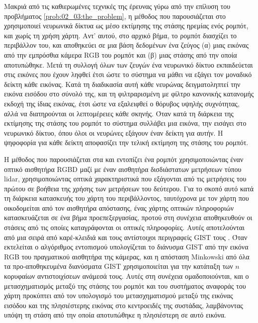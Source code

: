 Μακριά από τις καθιερωμένες τεχνικές της έρευνας γύρω από την επίλυση του
προβλήματος \ref{prob:02_03:the_problem}, η μέθοδος που παρουσιάζεται στο
\cite{Lyrio2014} χρησιμοποιεί νευρωνικά δίκτυα ως μέσο εκτίμησης της στάσης
ηρεμίας ενός ρομπότ, και χωρίς τη χρήση χάρτη. Αντ' αυτού, στο αρχικό βήμα, το
ρομπότ διασχίζει το περιβάλλον του, και αποθηκεύει σε μια βάση δεδομένων ένα
ζεύγος (α) μιας εικόνας από την εμπρόσθια κάμερα RGB του ρομπότ και (β) μιας
στάσης από την οποία αποτυπώθηκε.  Μετά τη συλλογή όλων των ζευγών ένα
νευρωνικό δίκτυο εκπαιδεύεται στις εικόνες που έχουν ληφθεί έτσι ώστε το
σύστημα να μάθει να εξάγει τον μοναδικό δείκτη κάθε εικόνας. Κατά τη διαδικασία
αυτή κάθε νευρώνας δειγματοληπτεί την εικόνα εισόδου στο σύνολό της, και τη
φιλτραρισμένη με φίλτρο κανονικής κατανομής εκδοχή της ίδιας εικόνας, έτσι ώστε
να εξαλειφθεί ο θόρυβος υψηλής συχνότητας, αλλά να διατηρούνται οι λεπτομέρειες
κάθε σκηνής.  Όταν κατά τη διάρκεια της εκτίμησης της στάσης του ρομπότ το
σύστημα συλλάβει μια εικόνα, την εισάγει στο νευρωνικό δίκτυο, όπου όλοι οι
νευρώνες εξάγουν έναν δείκτη για αυτήν. Η ψηφοφορία για κάθε δείκτη αποφασίζει
την τελική εκτίμηση της στάσης του ρομπότ.

Η μέθοδος που παρουσιάζεται στα \cite{Su2017} και \cite{Chen2019b} εντοπίζει
ένα ρομπότ χρησιμοποιώντας έναν οπτικό αισθητήρα RGBD μαζί με έναν αισθητήρα
δισδιάστατων μετρήσεων τύπου lidar, χρησιμοποιώντας οπτικά χαρακτηριστικά που
εξάγονται από τις μετρήσεις του πρώτου σε βοήθεια της χρήσης των μετρήσεων του
δεύτερου. Για το σκοπό αυτό κατά τη διάρκεια κατασκευής του χάρτη του
περιβάλλοντος, ταυτόχρονα με τον χάρτη που οικοδομείται από τον αισθητήρα
απόστασης, ένας χάρτης οπτικών πληροφοριών κατασκευάζεται σε ένα βήμα
προεπεξεργασίας, προτού στη συνέχεια αποθηκευθούν οι στάσεις από τις οποίες
καταγράφονται οι οπτικές πληροφορίες. Αυτές αποτελούνται από μια σειρά από
καρέ-κλειδιά και τους αντίστοιχοι περιγραφείς GIST τους
\cite{Singh2010,Azzi2015}. Όταν εκτελείται ο αλγόριθμος εντοπισμού
υπολογίζεται το διάνυσμα GIST από την εικόνα RGB του πραγματικού αισθητήρα της
κάμερας, και η απόσταση Minkowski από όλα τα προ-αποθηκευμένα διανύσματα GIST
χρησιμοποιείται για την κατάταξη των $n$ κορυφαίων αντιστοιχίσεων ανάμεσά τους.
Αυτές στη συνέχεια ομαδοποιούνται, και ο μετασχηματισμός μεταξύ της στάσης του
ρομπότ και του συστήματος αναφοράς του χάρτη προκύπτει από τον υπολογισμό του
μετασχηματισμού μεταξύ της εικόνας εισόδου και της πλησιέστερης εικόνας στο
κεντροειδές της συστάδας, λαμβάνοντας υπόψη τη στάση από την οποία αποτυπώθηκε
η πλησιέστερη σε αυτό εικόνα.

